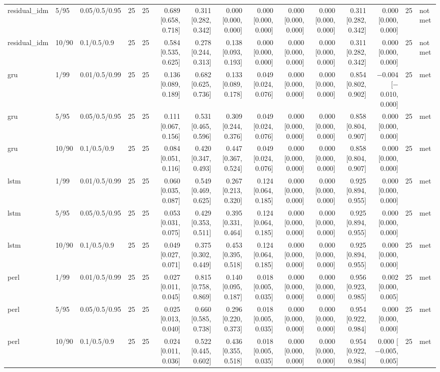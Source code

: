 \begin{table}[htbp]
{\begin{tabular}{lllrrrrrrrrrrrl}
residual\_idm & 5/95 & 0.05/0.5/0.95 & 25 & 25 & 0.689 [0.658, 0.718] & 0.311 [0.282, 0.342] & 0.000 [0.000, 0.000] & 0.000 [0.000, 0.000] & 0.000 [0.000, 0.000] & 0.000 [0.000, 0.000] & 0.311 [0.282, 0.342] & 0.000 [0.000, 0.000] & 25 & not met \\
residual\_idm & 10/90 & 0.1/0.5/0.9 & 25 & 25 & 0.584 [0.535, 0.625] & 0.278 [0.244, 0.313] & 0.138 [0.093, 0.193] & 0.000 [0.000, 0.000] & 0.000 [0.000, 0.000] & 0.000 [0.000, 0.000] & 0.311 [0.282, 0.342] & 0.000 [0.000, 0.000] & 25 & not met \\
gru & 1/99 & 0.01/0.5/0.99 & 25 & 25 & 0.136 [0.089, 0.189] & 0.682 [0.625, 0.736] & 0.133 [0.089, 0.178] & 0.049 [0.024, 0.076] & 0.000 [0.000, 0.000] & 0.000 [0.000, 0.000] & 0.854 [0.802, 0.902] & $-$0.004 [$-$0.010, 0.000] & 25 & met \\
gru & 5/95 & 0.05/0.5/0.95 & 25 & 25 & 0.111 [0.067, 0.156] & 0.531 [0.465, 0.596] & 0.309 [0.244, 0.376] & 0.049 [0.024, 0.076] & 0.000 [0.000, 0.000] & 0.000 [0.000, 0.000] & 0.858 [0.804, 0.907] & 0.000 [0.000, 0.000] & 25 & met \\
gru & 10/90 & 0.1/0.5/0.9 & 25 & 25 & 0.084 [0.051, 0.116] & 0.420 [0.347, 0.493] & 0.447 [0.367, 0.524] & 0.049 [0.024, 0.076] & 0.000 [0.000, 0.000] & 0.000 [0.000, 0.000] & 0.858 [0.804, 0.907] & 0.000 [0.000, 0.000] & 25 & met \\
lstm & 1/99 & 0.01/0.5/0.99 & 25 & 25 & 0.060 [0.035, 0.087] & 0.549 [0.469, 0.625] & 0.267 [0.213, 0.320] & 0.124 [0.064, 0.185] & 0.000 [0.000, 0.000] & 0.000 [0.000, 0.000] & 0.925 [0.894, 0.955] & 0.000 [0.000, 0.000] & 25 & met \\
lstm & 5/95 & 0.05/0.5/0.95 & 25 & 25 & 0.053 [0.031, 0.075] & 0.429 [0.353, 0.511] & 0.395 [0.331, 0.464] & 0.124 [0.064, 0.185] & 0.000 [0.000, 0.000] & 0.000 [0.000, 0.000] & 0.925 [0.894, 0.955] & 0.000 [0.000, 0.000] & 25 & met \\
lstm & 10/90 & 0.1/0.5/0.9 & 25 & 25 & 0.049 [0.027, 0.071] & 0.375 [0.302, 0.449] & 0.453 [0.395, 0.518] & 0.124 [0.064, 0.185] & 0.000 [0.000, 0.000] & 0.000 [0.000, 0.000] & 0.925 [0.894, 0.955] & 0.000 [0.000, 0.000] & 25 & met \\
perl & 1/99 & 0.01/0.5/0.99 & 25 & 25 & 0.027 [0.011, 0.045] & 0.815 [0.758, 0.869] & 0.140 [0.095, 0.187] & 0.018 [0.005, 0.035] & 0.000 [0.000, 0.000] & 0.000 [0.000, 0.000] & 0.956 [0.923, 0.985] & 0.002 [0.000, 0.005] & 25 & met \\
perl & 5/95 & 0.05/0.5/0.95 & 25 & 25 & 0.025 [0.013, 0.040] & 0.660 [0.585, 0.738] & 0.296 [0.220, 0.373] & 0.018 [0.005, 0.035] & 0.000 [0.000, 0.000] & 0.000 [0.000, 0.000] & 0.954 [0.922, 0.984] & 0.000 [0.000, 0.000] & 25 & met \\
perl & 10/90 & 0.1/0.5/0.9 & 25 & 25 & 0.024 [0.011, 0.036] & 0.522 [0.445, 0.602] & 0.436 [0.355, 0.518] & 0.018 [0.005, 0.035] & 0.000 [0.000, 0.000] & 0.000 [0.000, 0.000] & 0.954 [0.922, 0.984] & 0.000 [$-$0.005, 0.005] & 25 & met \\
\bottomrule
\end{tabular}
}
\end{table}
